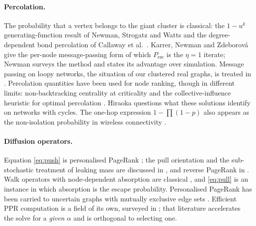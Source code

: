 \documentclass[11pt,a4paper]{article}
\newcommand{\Pesc}{P_{\mathrm{esc}}}
\begin{document}
\paragraph{Percolation.} The probability that a vertex belongs to the giant
cluster is classical: the $1-u^k$ generating-function result of Newman, Strogatz
and Watts \cite{nsw01} and the degree-dependent bond percolation of Callaway et
al.\ \cite{callaway00}. Karrer, Newman and Zdeborov\'a \cite{knz14} give the
per-node message-passing form of which $\Pesc$ is the $\eta=1$ iterate; Newman
\cite{newman23} surveys the method and states its advantage over simulation.
Message passing on loopy networks, the situation of our clustered real
graphs, is treated in \cite{cantwell19}. Percolation quantities have been
used for node ranking, though in different limits: non-backtracking
centrality at criticality \cite{radicchi16} and the collective-influence
heuristic for optimal percolation \cite{morone15}. Hiraoka
\cite{hiraoka26} questions what these solutions identify on networks with cycles.
The one-hop expression $1-\prod(1-p)$ also appears as the non-isolation
probability in wireless connectivity \cite{takabe18}.

\paragraph{Diffusion operators.} Equation \eqref{eq:push} is personalised
PageRank \cite{pagerank99,haveliwala03}; the pull orientation and the
sub-stochastic treatment of leaking mass are discussed in \cite{gleich15}, and
reverse PageRank in \cite{baryossef08}. Walk operators with node-dependent
absorption are classical \cite{wu12}, and \eqref{eq:pull} is an instance in
which absorption is the escape probability. Personalised PageRank has been
carried to uncertain graphs with mutually exclusive edge sets \cite{kim17}.
Efficient PPR computation is a field of its own, surveyed in \cite{yang24};
that literature accelerates the solve for a \emph{given} $\alpha$ and is
orthogonal to selecting one.
\end{document}
